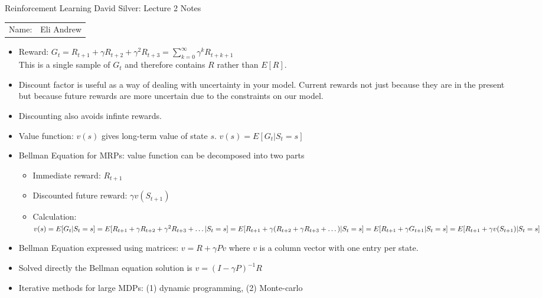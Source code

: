 \documentclass[12pt]{article}
\begin{document}
\begin{center}
{\Large Reinforcement Learning David Silver: Lecture 2 Notes}

\begin{tabular}{rl}
Name: & Eli Andrew
\end{tabular}
\end{center}

  \begin{itemize}
    \item Reward: 
    $G_t = R_{t+1} + \gamma R_{t+2} + \gamma^2 R_{t+3} = \sum_{k = 0}^{\infty}\gamma^k R_{t+k+1}$ \\
    This is a single sample of $G_t$ and therefore contains $R$ rather than $E[R]$.
    \item Discount factor is useful as a way of dealing with uncertainty in your model.
    Current rewards not just because they are in the present but because future rewards 
    are more uncertain due to the constraints on our model.  
    \item Discounting also avoids infinte rewards.
    \item Value function: $v(s)$ gives long-term value of state $s$.
    $v(s) = E[G_t | S_t = s]$
    \item Bellman Equation for MRPs: value function can be decomposed into two parts
    \begin{itemize}
      \item Immediate reward: $R_{t+1}$
      \item Discounted future reward: $\gamma v(S_{t+1})$
      \item Calculation: \\
      $v(s) = E[G_t | S_t = s] \\
      = E[R_{t+1} + \gamma R_{t+2} + \gamma^2 R_{t+3} + \dots | S_t = s] \\
      = E[R_{t+1} + \gamma (R_{t+ 2} + \gamma R_{t+3} + \dots ) | S_t = s] \\
      = E[R_{t+1} + \gamma G_{t+1} | S_t = s] \\
      = E[R_{t+1} + \gamma v(S_{t+1}) | S_t = s]$
    \end{itemize}
    \item Bellman Equation expressed using matrices: $v = R + \gamma Pv$
    where $v$ is a column vector with one entry per state.
    \item Solved directly the Bellman equation solution is $v = (I - \gamma P)^{-1}R$
    \item Iterative methods for large MDPs: (1) dynamic programming, (2) Monte-carlo

\end{itemize}
\end{document}
